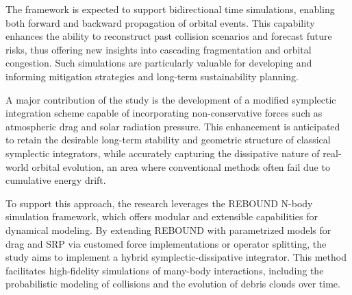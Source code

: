 \documentclass[letterpaper, preprint, paper,11pt]{AAS}	%
\begin{document}
The framework is expected to support bidirectional time simulations, enabling both forward and backward propagation of orbital events. This capability enhances the ability to reconstruct past collision scenarios and forecast future risks, thus offering new insights into cascading fragmentation and orbital congestion. Such simulations are particularly valuable for developing and informing mitigation strategies and long-term sustainability planning.

A major contribution of the study is the development of a modified symplectic integration scheme capable of incorporating non-conservative forces such as atmospheric drag and solar radiation pressure. This enhancement is anticipated to retain the desirable long-term stability and geometric structure of classical symplectic integrators, while accurately capturing the dissipative nature of real-world orbital evolution, an area where conventional methods often fail due to cumulative energy drift.

To support this approach, the research leverages the REBOUND N-body simulation framework, which offers modular and extensible capabilities for dynamical modeling. By extending REBOUND with parametrized models for drag and SRP via customed force implementations or operator splitting, the study aims to implement a hybrid symplectic-dissipative integrator. This method facilitates high-fidelity simulations of many-body interactions, including the probabilistic modeling of collisions and the evolution of debris clouds over time.

\end{document}

